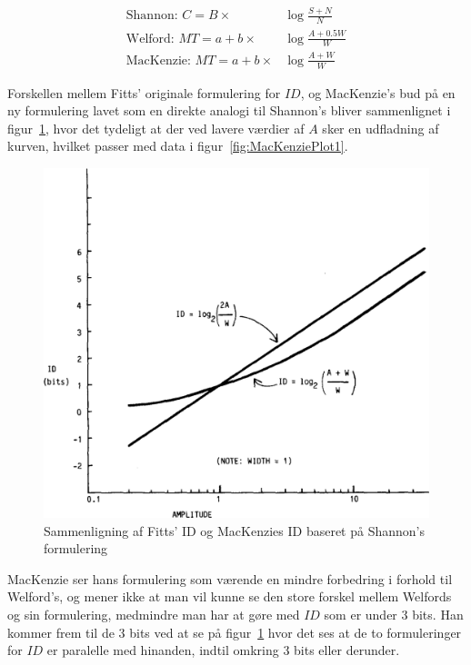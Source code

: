 \begin{align}
\text{Shannon: }C=B\times&\log{\frac{S+N}{N}}\\
\text{Welford: }MT=a+b\times&\log{\frac{A+0.5W}{W}}\\
\text{MacKenzie: }MT=a+b\times&\log{\frac{A+W}{W}}
\end{align}

Forskellen mellem Fitts' originale formulering for $ID$, og MacKenzie's bud på en ny formulering lavet som en direkte analogi til Shannon's bliver sammenlignet i figur~\ref{fig:MacKenziePlot2}, hvor det tydeligt at der ved lavere værdier af $A$ sker en udfladning af kurven, hvilket passer med data i figur~\ref{fig:MacKenziePlot1}.\\
\begin{figure}[h]
\centering
\includegraphics[scale=0.5]{images/illustrations/mackenzie_plot_2}
\caption{Sammenligning af Fitts' ID og MacKenzies ID baseret på Shannon's formulering}
\label{fig:MacKenziePlot2}
\end{figure}
MacKenzie ser hans formulering som værende en mindre forbedring i forhold til Welford's, og mener ikke at man vil kunne se den store forskel mellem Welfords og sin formulering, medmindre man har at gøre med $ID$ som er under 3 bits. Han kommer frem til de 3 bits ved at se på figur~\ref{fig:MacKenziePlot2} hvor det ses at de to formuleringer for $ID$ er paralelle med hinanden, indtil omkring 3 bits eller derunder.\\

